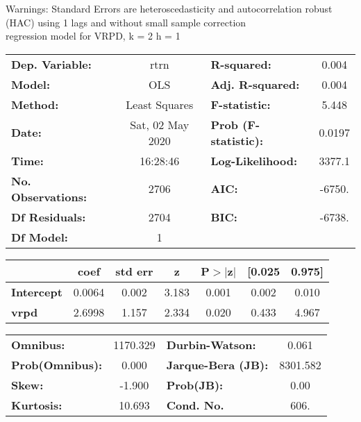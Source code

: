 Warnings: \newline
 [1] Standard Errors are heteroscedasticity and autocorrelation robust (HAC) using 1 lags and without small sample correction\\ 

regression model for VRPD, k = 2 h = 1\begin{center}
\begin{tabular}{lclc}
\toprule
\textbf{Dep. Variable:}    &       rtrn       & \textbf{  R-squared:         } &     0.004   \\
\textbf{Model:}            &       OLS        & \textbf{  Adj. R-squared:    } &     0.004   \\
\textbf{Method:}           &  Least Squares   & \textbf{  F-statistic:       } &     5.448   \\
\textbf{Date:}             & Sat, 02 May 2020 & \textbf{  Prob (F-statistic):} &   0.0197    \\
\textbf{Time:}             &     16:28:46     & \textbf{  Log-Likelihood:    } &    3377.1   \\
\textbf{No. Observations:} &        2706      & \textbf{  AIC:               } &    -6750.   \\
\textbf{Df Residuals:}     &        2704      & \textbf{  BIC:               } &    -6738.   \\
\textbf{Df Model:}         &           1      & \textbf{                     } &             \\
\bottomrule
\end{tabular}
\begin{tabular}{lcccccc}
                   & \textbf{coef} & \textbf{std err} & \textbf{z} & \textbf{P$> |$z$|$} & \textbf{[0.025} & \textbf{0.975]}  \\
\midrule
\textbf{Intercept} &       0.0064  &        0.002     &     3.183  &         0.001        &        0.002    &        0.010     \\
\textbf{vrpd}      &       2.6998  &        1.157     &     2.334  &         0.020        &        0.433    &        4.967     \\
\bottomrule
\end{tabular}
\begin{tabular}{lclc}
\textbf{Omnibus:}       & 1170.329 & \textbf{  Durbin-Watson:     } &    0.061  \\
\textbf{Prob(Omnibus):} &   0.000  & \textbf{  Jarque-Bera (JB):  } & 8301.582  \\
\textbf{Skew:}          &  -1.900  & \textbf{  Prob(JB):          } &     0.00  \\
\textbf{Kurtosis:}      &  10.693  & \textbf{  Cond. No.          } &     606.  \\
\bottomrule
\end{tabular}
\end{center}

